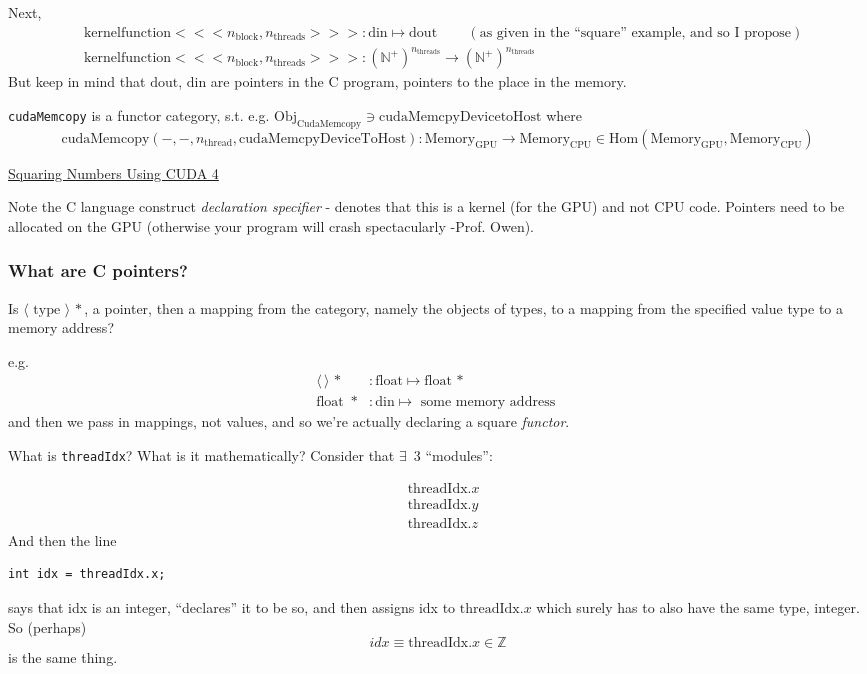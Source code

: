 \documentclass[10pt]{amsart}
\begin{document}
\begin{multicols*}{2}
Next,
\[
\begin{aligned}
  & \text{kernelfunction}<<<n_{\text{block}},n_{\text{threads}}>>>: \text{din}\mapsto \text{dout} \qquad \, (\text{as given in the ``square'' example, and so I propose}) \\ 
  & \text{kernelfunction}<<<n_{\text{block}},n_{\text{threads}}>>>:(\mathbb{N}^+)^{n_{\text{threads}}} \to (\mathbb{N}^+)^{n_{\text{threads}}}
  \end{aligned}
\]
But keep in mind that $\text{dout}$, $\text{din}$ are pointers in the C program, pointers to the place in the memory.  

\verb|cudaMemcopy| is a functor category, s.t. e.g. $\text{Obj}_{\text{CudaMemcopy}} \ni \text{cudaMemcpyDevicetoHost}$ where
\[
\text{cudaMemcopy}(-,-,n_{\text{thread}},\text{cudaMemcpyDeviceToHost}): \text{Memory}_{\text{GPU}} \to \text{Memory}_{\text{CPU}} \in \text{Hom}(\text{Memory}_{\text{GPU}}, \text{Memory}_{\text{CPU}})
\]

\href{https://classroom.udacity.com/courses/cs344/lessons/55120467/concepts/670742910923}{Squaring Numbers Using CUDA 4}

Note the C language construct \emph{declaration specifier} - denotes that this is a kernel (for the GPU) and not CPU code.  Pointers need to be allocated on the GPU (otherwise your program will crash spectacularly -Prof. Owen).  

\subsubsection{What are C pointers?}

Is $\langle \text{ type } \rangle \, *$, a pointer, then a mapping from the category, namely the objects of types, to a mapping from the specified value type to a memory address?

e.g.
\[
\begin{aligned}
  \langle \, \rangle \, * & : \text{float} \mapsto \text{float} \, * \\ 
  \text{float } \, * & : \text{din} \mapsto \text{ some memory address }
\end{aligned}
\]
and then we pass in mappings, not values, and so we're actually declaring a square \emph{functor}.

What is \verb|threadIdx|?  What is it mathematically?  Consider that $\exists \,$ 3 ``modules'':

\[
\begin{aligned}
  & \text{threadIdx}.x \\
  & \text{threadIdx}.y \\
  & \text{threadIdx}.z 
\end{aligned}
\]
And then the line
\begin{lstlisting}
int idx = threadIdx.x;
  \end{lstlisting}
says that idx is an integer, ``declares'' it to be so, and then assigns idx to $\text{threadIdx}.x$ which surely has to also have the same type, integer.  So (perhaps)
\[
idx \equiv \text{threadIdx}.x \in \mathbb{Z}
\]
is the same thing.


\end{multicols*}
\end{document}
